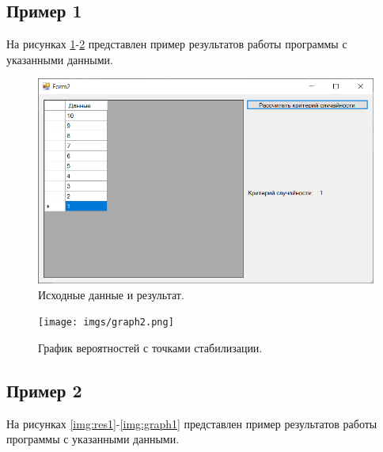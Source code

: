 \documentclass[12pt]{report}
\begin{document}
\subsection{Пример 1}

На рисунках \ref{img:res2}-\ref{img:graph2} представлен пример результатов работы программы с указанными данными.

\begin{figure}[H]
	\begin{center}
		\includegraphics[scale=0.6]{imgs/res2.png}
	\end{center}
	\caption{Исходные данные и результат.}
	\label{img:res2}
\end{figure}

\begin{figure}[H]
	\begin{center}
		\texttt{[image: imgs/graph2.png]}
	\end{center}
	\caption{График вероятностей с точками стабилизации.}
	\label{img:graph2}
\end{figure}

\subsection{Пример 2}

На рисунках \ref{img:res1}-\ref{img:graph1} представлен пример результатов работы программы с указанными данными.
\end{document}
